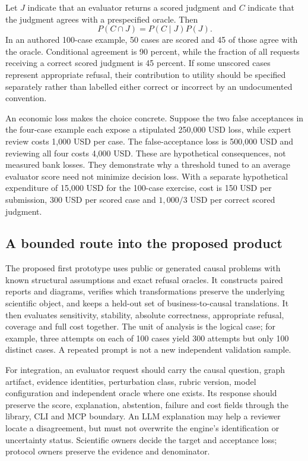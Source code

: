 Let $J$ indicate that an evaluator returns a scored judgment and $C$ indicate
that the judgment agrees with a prespecified oracle. Then
\[
 P(C\cap J)=P(C\mid J)P(J).
\]
In an authored 100-case example, 50 cases are scored and 45 of those agree
with the oracle. Conditional agreement is 90 percent, while the fraction
of all requests receiving a correct scored judgment is 45 percent. If
some unscored cases represent appropriate refusal, their contribution to
utility should be specified separately rather than labelled either correct
or incorrect by an undocumented convention.
\citep{exec24_judgebias_reference}

An economic loss makes the choice concrete. Suppose the two false
acceptances in the four-case example each expose a stipulated 250,000 USD
loss, while expert review costs 1,000 USD per case. The false-acceptance
loss is 500,000 USD and reviewing all four costs 4,000 USD. These are
hypothetical consequences, not measured bank losses. They demonstrate why
a threshold tuned to an average evaluator score need not minimize decision
loss. With a separate hypothetical expenditure of 15,000 USD for the
100-case exercise, cost is 150 USD per submission, 300 USD per scored case
and $1{,}000/3$ USD per correct scored judgment.
\citep{exec24_judgebias_reference}

\subsection{A bounded route into the proposed product}

The proposed first prototype uses public or generated causal problems with
known structural assumptions and exact refusal oracles. It constructs
paired reports and diagrams, verifies which transformations preserve the
underlying scientific object, and keeps a held-out set of business-to-causal
translations. It then evaluates sensitivity, stability, absolute correctness,
appropriate refusal, coverage and full cost together. The unit of analysis
is the logical case; for example, three attempts on each of 100 cases yield
300 attempts but only 100 distinct cases. A repeated prompt is not a new
independent validation sample.~\citep{exec24_judgebias_reference}

For integration, an evaluator request should carry the causal question,
graph artifact, evidence identities, perturbation class, rubric version,
model configuration and independent oracle where one exists. Its response
should preserve the score, explanation, abstention, failure and cost fields
through the library, CLI and MCP boundary. An LLM explanation may help a
reviewer locate a disagreement, but must not overwrite the engine's
identification or uncertainty status. Scientific owners decide the target
and acceptance loss; protocol owners preserve the evidence and denominator.
\citep{exec24_judgebias_reference}

